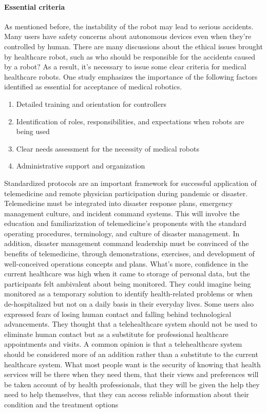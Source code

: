 \documentclass[a4paper]{article}
\begin{document}
\paragraph{Essential criteria} 
    As mentioned before, the instability of the robot may lead to serious accidents. Many users have safety concerns about autonomous devices even when they're controlled by human. There are many discussions about the ethical issues brought by healthcare robot, such as who should be responsible for the accidents caused by a robot? As a result, it's necessary to issue some clear criteria for medical healthcare robots. One study emphasizes the importance of the following factors identified as essential for acceptance of medical robotics.
\begin{enumerate}
    \item Detailed training and orientation for controllers
    \item Identification of roles, responsibilities, and expectations when robots are being used
    \item Clear needs assessment for the necessity of medical robots
    \item Administrative support and organization
\end{enumerate}
    Standardized protocols are an important framework for successful application of telemedicine and remote physician participation during pandemic or disaster. Telemedicine must be integrated into disaster response plans, emergency management culture, and incident command systems. This will involve the education and familiarization of telemedicine's proponents with the standard operating procedures, terminology, and culture of disaster management. In addition, disaster management command leadership must be convinced of the benefits of telemedicine, through demonstrations, exercises, and development of well-conceived operations concepts and plans. What's more, confidence in the current healthcare was high when it came to storage of personal data, but the participants felt ambivalent about being monitored. They could imagine being monitored as a temporary solution to identify health-related problems or when de-hospitalized but not on a daily basis in their everyday lives. Some users also expressed fears of losing human contact and falling behind technological advancements. They thought that a telehealthcare system should not be used to eliminate human contact but as a substitute for professional healthcare appointments and visits. A common opinion is that a telehealthcare system should be considered more of an addition rather than a substitute to the current healthcare system\cite{30}. What most people want is the security of knowing that health services will be there when they need them, that their views and preferences will be taken account of by health professionals, that they will be given the help they need to help themselves, that they can access reliable information about their condition and the treatment options
\end{document}
